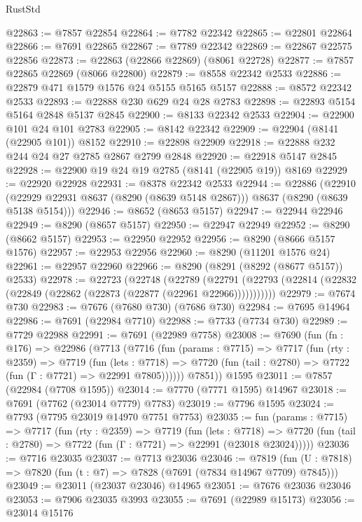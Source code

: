 \begin{lexlean}{RustStd}
\begin{coremodule}
@22863 := @7857 @22854
@22864 := @7782 @22342
@22865 := @22801 @22864
@22866 := @7691 @22865
@22867 := @7789 @22342
@22869 := @22867 @22575 @22856
@22873 := @22863 (@22866 @22869) (@8061 @22728)
@22877 := @7857 @22865 @22869 (@8066 @22800)
@22879 := @8558 @22342 @2533
@22886 := @22879 @471 @1579 @1576 @24 @5155 @5165 @5157
@22888 := @8572 @22342 @2533
@22893 := @22888 @230 @629 @24 @28 @2783
@22898 := @22893 @5154 @5164 @2848 @5137 @2845
@22900 := @8133 @22342 @2533
@22904 := @22900 @101 @24 @101 @2783
@22905 := @8142 @22342
@22909 := @22904 (@8141 (@22905 @101)) @8152
@22910 := @22898 @22909
@22918 := @22888 @232 @244 @24 @27 @2785 @2867 @2799 @2848
@22920 := @22918 @5147 @2845
@22928 := @22900 @19 @24 @19 @2785 (@8141 (@22905 @19)) @8169
@22929 := @22920 @22928
@22931 := @8378 @22342 @2533
@22944 := @22886
    (@22910 (@22929 @22931 @8637 (@8290 (@8639 @5148 @2867))) @8637 (@8290 (@8639 @5138 @5154)))
@22946 := @8652 (@8653 @5157)
@22947 := @22944 @22946
@22949 := @8290 (@8657 @5157)
@22950 := @22947 @22949
@22952 := @8290 (@8662 @5157)
@22953 := @22950 @22952
@22956 := @8290 (@8666 @5157 @1576)
@22957 := @22953 @22956
@22960 := @8290 (@11201 @1576 @24)
@22961 := @22957 @22960
@22966 := @8290 (@8291 (@8292 (@8677 @5157)) @2533)
@22978 := @22723
    (@22748
      (@22789
        (@22791 (@22793 (@22814 (@22832 (@22849 (@22862 (@22873 (@22877 (@22961 @22966)))))))))))
@22979 := @7674 @730
@22983 := @7676 (@7680 @730) (@7686 @730)
@22984 := @7695 @14964
@22986 := @7691 (@22984 @7710)
@22988 := @7733 (@7734 @730)
@22989 := @7729 @22988
@22991 := @7691 (@22989 @7758)
@23008 := @7690
    (fun (fn : @176) =>
    @22986
      (@7713
        (@7716
          (fun (params : @7715) =>
          @7717
            (fun (rty : @2359) =>
            @7719
              (fun (lets : @7718) =>
              @7720 (fun (tail : @2780) => @7722 (fun (Γ : @7721) => @22991 @7805))))))
        @7851))
    @1595
@23011 := @7857 (@22984 (@7708 @1595))
@23014 := @7770 (@7771 @1595) @14967
@23018 := @7691 (@7762 (@23014 @7779) @7783)
@23019 := @7796 @1595
@23024 := @7793 (@7795 @23019 @14970 @7751 @7753)
@23035 := fun (params : @7715) =>
  @7717
    (fun (rty : @2359) =>
    @7719
      (fun (lets : @7718) =>
      @7720 (fun (tail : @2780) => @7722 (fun (Γ : @7721) => @22991 (@23018 @23024)))))
@23036 := @7716 @23035
@23037 := @7713 @23036
@23046 := @7819
    (fun (U : @7818) => @7820 (fun (t : @7) => @7828 (@7691 (@7834 @14967 @7709) @7845)))
@23049 := @23011 (@23037 @23046) @14965
@23051 := @7676 @23036 @23046
@23053 := @7906 @23035 @3993
@23055 := @7691 (@22989 @15173)
@23056 := @23014 @15176

\end{coremodule}
\end{lexlean}

